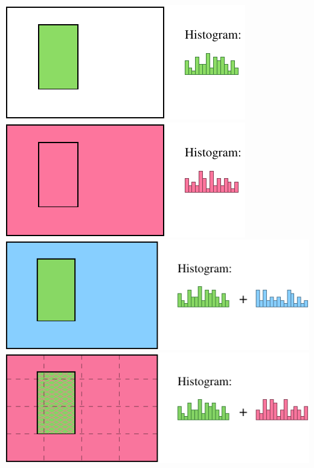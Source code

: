 \documentclass{beamer}
\begin{document}
\begin{frame}
 {\hspace{1cm}\includegraphics[scale=0.9]{figs/histo_person.pdf}}
 {\hspace{1cm}\includegraphics[scale=0.9]{figs/histo_image.pdf}}
 {\hspace{1cm}\includegraphics[scale=0.9]{figs/histo_person_backgnd.pdf}}
 {\hspace{1cm}\includegraphics[scale=0.9]{figs/histo_person_image.pdf}}

\end{frame}
\end{document}
